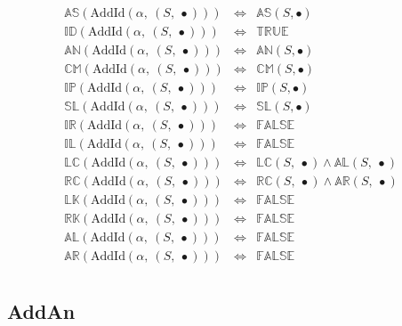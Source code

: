 \documentclass[10pt]{article}
\newcommand{\propname}[1]{{\mathbb{#1}}}
\begin{document}
\[
\begin{array}{rcl} 
\propname{AS}(\mathrm{AddId}(\alpha,\ (S,\ \bullet))) 
  & \Leftrightarrow %
  & \propname{AS}(S, \bullet) \\
\propname{ID}(\mathrm{AddId}(\alpha,\ (S,\ \bullet))) 
  & \Leftrightarrow %
  & \propname{TRUE} \\ 
\propname{AN}(\mathrm{AddId}(\alpha,\ (S,\ \bullet))) 
  & \Leftrightarrow %
  & \propname{AN}(S, \bullet) \\
\propname{CM}(\mathrm{AddId}(\alpha,\ (S,\ \bullet))) 
  & \Leftrightarrow %
  & \propname{CM}(S, \bullet) \\
\propname{IP}(\mathrm{AddId}(\alpha,\ (S,\ \bullet))) 
  & \Leftrightarrow %
  & \propname{IP}(S, \bullet) \\
\propname{SL}(\mathrm{AddId}(\alpha,\ (S,\ \bullet))) 
  & \Leftrightarrow %
  & \propname{SL}(S, \bullet) \\
\propname{IR}(\mathrm{AddId}(\alpha,\ (S,\ \bullet))) 
  & \Leftrightarrow %
  & \propname{FALSE}\\ 
\propname{IL}(\mathrm{AddId}(\alpha,\ (S,\ \bullet))) 
  & \Leftrightarrow %
  & \propname{FALSE}\\ 
\propname{LC}(\mathrm{AddId}(\alpha,\ (S,\ \bullet))) 
  & \Leftrightarrow %
  & \propname{LC}(S,\ \bullet) \wedge \propname{AL}(S,\ \bullet) \\
\propname{RC}(\mathrm{AddId}(\alpha,\ (S,\ \bullet))) 
  & \Leftrightarrow %
  & \propname{RC}(S,\ \bullet) \wedge \propname{AR}(S,\ \bullet) \\
\propname{LK}(\mathrm{AddId}(\alpha,\ (S,\ \bullet))) 
  & \Leftrightarrow %
  & \propname{FALSE}\\ 
\propname{RK}(\mathrm{AddId}(\alpha,\ (S,\ \bullet))) 
  & \Leftrightarrow %
  & \propname{FALSE}\\ 
\propname{AL}(\mathrm{AddId}(\alpha,\ (S,\ \bullet))) 
  & \Leftrightarrow %
  & \propname{FALSE}\\ 
\propname{AR}(\mathrm{AddId}(\alpha,\ (S,\ \bullet))) 
  & \Leftrightarrow %
  & \propname{FALSE}\\ 
\end{array} 
\] 

\subsection{AddAn} 
\end{document}
